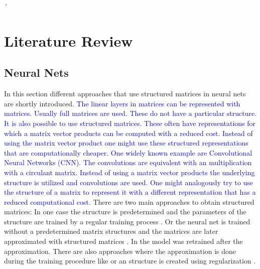 \documentclass[doctype=mastersthesis,BCOR=15mm,biblatex]{ldvbook}%
\begin{document}
´

\chapter{Literature Review}

\section{Neural Nets}
In this section different approaches that use structured matrices in neural nets are shortly introduced.
\textcolor{blue}{The linear layers in matrices can be represented with matrices.
Usually full matrices are used. These do not have a particular structure.
It is also possible to use structured matrices.
These often have representations for which a matrix vector products can be computed with a reduced cost.
Instead of using the matrix vector product one might use these structured representations that are computationally cheaper.
One widely known example are Convolutional Neural Networks (CNN).
The convolutions are equivalent with an multiplication with a circulant matrix.
Instead of using a matrix vector products the underlying structure is utilized and convolutions are used.
One might analogously try to use the structure of a matrix to represent it with a different representation that has a reduced computational cost.}
There are two main approaches to obtain structured matrices:
In one case the structure is predetermined and the parameters of the structure are trained by a regular training process \cite{fan_multiscale_2019,dao_kaleidoscope_2020,li_butterfly_2015,ailon_sparse_2021,ioannou_training_2016}.
Or the neural net is trained without a predetermined matrix structures and the matrices are later approximated with structured matrices \cite{wu_hybrid_2020,hassibi_optimal_1993,jaderberg_speeding_2014,rigamonti_learning_2013}. In \cite{yu_compressing_2017} the model was retrained after the approximation. 
There are also approaches where the approximation is done during the training procedure like \cite{dettmers_sparse_2019} or an structure is created using regularization \cite{louizos_learning_2018,wen_learning_2016}.
\end{document}
